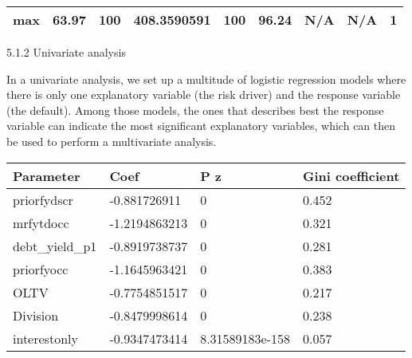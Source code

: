 \begin{longtable}[]{@{}lllllllll@{}}
\begin{minipage}[t]{0.05\columnwidth}\raggedright
max\strut
\end{minipage} & \begin{minipage}[t]{0.08\columnwidth}\raggedright
63.97\strut
\end{minipage} & \begin{minipage}[t]{0.09\columnwidth}\raggedright
100\strut
\end{minipage} & \begin{minipage}[t]{0.09\columnwidth}\raggedright
408.3590591\strut
\end{minipage} & \begin{minipage}[t]{0.08\columnwidth}\raggedright
100\strut
\end{minipage} & \begin{minipage}[t]{0.09\columnwidth}\raggedright
96.24\strut
\end{minipage} & \begin{minipage}[t]{0.09\columnwidth}\raggedright
N/A\strut
\end{minipage} & \begin{minipage}[t]{0.08\columnwidth}\raggedright
N/A\strut
\end{minipage} & \begin{minipage}[t]{0.11\columnwidth}\raggedright
1\strut
\end{minipage}\tabularnewline
\bottomrule
\end{longtable}

5.1.2 Univariate analysis

In a univariate analysis, we set up a multitude of logistic regression
models where there is only one explanatory variable (the risk driver)
and the response variable (the default). Among those models, the ones
that describes best the response variable can indicate the most
significant explanatory variables, which can then be used to perform a
multivariate analysis.

\begin{longtable}[]{@{}llll@{}}
\toprule
Parameter & Coef & P z & Gini coefficient\tabularnewline
\midrule
\endhead
priorfydscr & -0.881726911 & 0 & 0.452\tabularnewline
mrfytdocc & -1.2194863213 & 0 & 0.321\tabularnewline
debt\_yield\_p1 & -0.8919738737 & 0 & 0.281\tabularnewline
priorfyocc & -1.1645963421 & 0 & 0.383\tabularnewline
OLTV & -0.7754851517 & 0 & 0.217\tabularnewline
Division & -0.8479998614 & 0 & 0.238\tabularnewline
interestonly & -0.9347473414 & 8.31589183e-158 & 0.057\tabularnewline
\bottomrule
\end{longtable}

